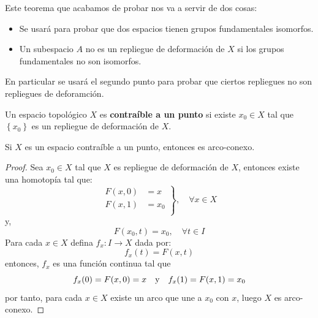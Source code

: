 \documentclass[12pt]{report}
\theoremstyle{largebreak}
\newcommand\cf[3]{\ensuremath{#1:#2\rightarrow#3}}
\begin{document}
    Este teorema que acabamos de probar nos va a servir de dos cosas:
    \begin{itemize}
        \item Se usará para probar que dos espacios tienen grupos fundamentales isomorfos.
        \item Un subespacio $A$ no es un repliegue de deformación de $X$ si los grupos fundamentales no son isomorfos.
    \end{itemize}

    En particular se usará el segundo punto para probar que ciertos repliegues no son repliegues de deforamción.

    \begin{mydef}
        Un espacio topológico $X$ es \textbf{contraíble a un punto} si existe $x_0\in X$ tal que $\left\{x_0\right\}$ es un repliegue de deformación de $X$.
    \end{mydef}

    \begin{propo}
        Si $X$ es un espacio contraíble a un punto, entonces es arco-conexo.
    \end{propo}

    \begin{proof}
        Sea $x_0\in X$ tal que $X$ es repliegue de deformación de $X$, entonces existe una homotopía tal que:
        \begin{equation*}
            \left.
                \begin{split}
                    F(x,0) & = x \\
                    F(x,1) & = x_0 \\
                \end{split}
            \right\},\quad\forall x\in X
        \end{equation*}
        y,
        \begin{equation*}
            F(x_0,t)=x_0,\quad\forall t\in I
        \end{equation*}
        Para cada $x\in X$ defina $\cf{f_x}{I}{X}$ dada por:
        \begin{equation*}
            f_x(t)=F(x,t)
        \end{equation*}
        entonces, $f_x$ es una función continua tal que
        \begin{equation*}
            f_x(0)=F(x,0)=x\quad\textup{y}\quad f_x(1)=F(x,1)=x_0
        \end{equation*}
        por tanto, para cada $x\in X$ existe un arco que une a $x_0$ con $x$, luego $X$ es arco-conexo.
    \end{proof}
\end{document}
